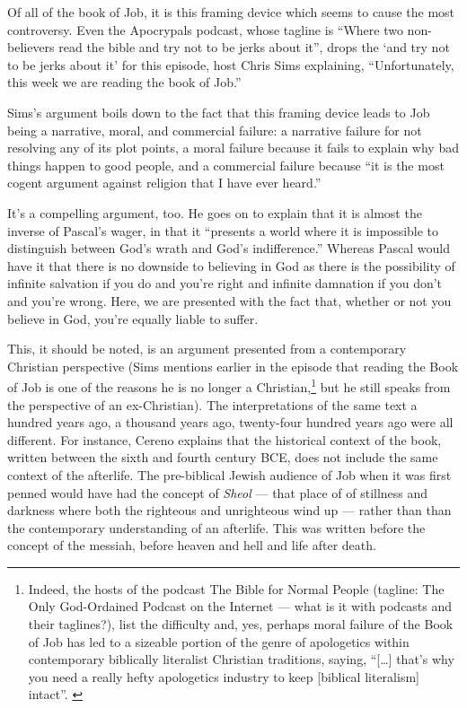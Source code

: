 Of all of the book of Job, it is this framing device which seems to cause the most controversy. Even the Apocrypals podcast, whose tagline is ``Where two non-believers read the bible and try not to be jerks about it'', drops the `and try not to be jerks about it' for this episode, host Chris Sims explaining, ``Unfortunately, this week we are reading the book of Job.'' \parencite{apocrypals}

Sims's argument boils down to the fact that this framing device leads to Job being a narrative, moral, and commercial failure: a narrative failure for not resolving any of its plot points, a moral failure because it fails to explain why bad things happen to good people, and a commercial failure because ``it is the most cogent argument against religion that I have ever heard.''

It's a compelling argument, too. He goes on to explain that it is almost the inverse of Pascal's wager, in that it ``presents a world where it is impossible to distinguish between God's wrath and God's indifference.'' Whereas Pascal would have it that there is no downside to believing in God as there is the possibility of infinite salvation if you do and you're right and infinite damnation if you don't and you're wrong. Here, we are presented with the fact that, whether or not you believe in God, you're equally liable to suffer.

This, it should be noted, is an argument presented from a contemporary Christian perspective (Sims mentions earlier in the episode that reading the Book of Job is one of the reasons he is no longer a Christian,\footnote{Indeed, the hosts of the podcast The Bible for Normal People (tagline: The Only God-Ordained Podcast on the Internet --- what is it with podcasts and their taglines?), list the difficulty and, yes, perhaps moral failure of the Book of Job has led to a sizeable portion of the genre of apologetics within contemporary biblically literalist Christian traditions, saying, ``{[}\ldots{]} that's why you need a really hefty apologetics industry to keep {[}biblical literalism{]} intact''. \parencite{b4np}} but he still speaks from the perspective of an ex-Christian). The interpretations of the same text a hundred years ago, a thousand years ago, twenty-four hundred years ago were all different. For instance, Cereno explains that the historical context of the book, written between the sixth and fourth century BCE, does not include the same context of the afterlife. The pre-biblical Jewish audience of Job when it was first penned would have had the concept of \emph{Sheol} --- that place of of stillness and darkness where both the righteous and unrighteous wind up --- rather than than the contemporary understanding of an afterlife. This was written before the concept of the messiah, before heaven and hell and life after death.

